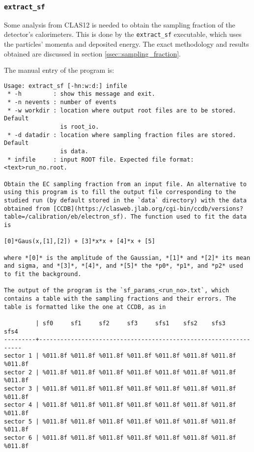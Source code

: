 \subsubsection{\texttt{extract\_sf}}
    Some analysis from CLAS12 is needed to obtain the sampling fraction of the detector's calorimeters.
    This is done by the \texttt{extract\_sf} executable, which uses the particles' momenta and deposited energy.
    The exact methodology and results obtained are discussed in section \ref{ssec::sampling_fraction}.

    The manual entry of the program is:
    \begin{lstlisting}
Usage: extract_sf [-hn:w:d:] infile
 * -h         : show this message and exit.
 * -n nevents : number of events
 * -w workdir : location where output root files are to be stored. Default
                is root_io.
 * -d datadir : location where sampling fraction files are stored. Default
                is data.
 * infile     : input ROOT file. Expected file format: <text>run_no.root.

Obtain the EC sampling fraction from an input file. An alternative to using this program is to fill the output file corresponding to the studied run (by default stored in the `data` directory) with the data obtained from [CCDB](https://clasweb.jlab.org/cgi-bin/ccdb/versions?table=/calibration/eb/electron_sf). The function used to fit the data is

[0]*Gaus(x,[1],[2]) + [3]*x*x + [4]*x + [5]

where *[0]* is the amplitude of the Gaussian, *[1]* and *[2]* its mean and sigma, and *[3]*, *[4]*, and *[5]* the *p0*, *p1*, and *p2* used to fit the background.

The output of the program is the `sf_params_<run_no>.txt`, which contains a table with the sampling fractions and their errors. The table is formatted like the one at CCDB, as in

         | sf0     sf1     sf2     sf3     sfs1    sfs2    sfs3    sfs4
---------+-----------------------------------------------------------------
sector 1 | %011.8f %011.8f %011.8f %011.8f %011.8f %011.8f %011.8f %011.8f
sector 2 | %011.8f %011.8f %011.8f %011.8f %011.8f %011.8f %011.8f %011.8f
sector 3 | %011.8f %011.8f %011.8f %011.8f %011.8f %011.8f %011.8f %011.8f
sector 4 | %011.8f %011.8f %011.8f %011.8f %011.8f %011.8f %011.8f %011.8f
sector 5 | %011.8f %011.8f %011.8f %011.8f %011.8f %011.8f %011.8f %011.8f
sector 6 | %011.8f %011.8f %011.8f %011.8f %011.8f %011.8f %011.8f %011.8f
    \end{lstlisting}
